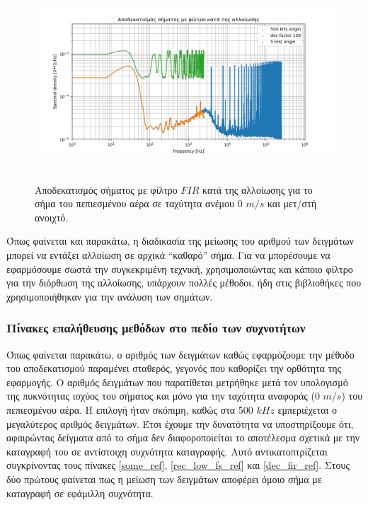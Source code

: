 \documentclass[breaklines=true, 12pt]{article}
\begin{document}
{{{\begin{figure}[htbp]
\centering
\includegraphics[width=500px,height=280px]{./decimation/anti_aliasing_fir.png}
\caption{\label{without_al}Αποδεκατισμός σήματος με φίλτρο \(FIR\) κατά της αλλοίωσης για το σήμα του πεπιεσμένου αέρα σε ταχύτητα ανέμου 0 \(m/s\) και μετ/στή ανοιχτό.}
\end{figure}

Όπως φαίνεται και παρακάτω, η διαδικασία της μείωσης του αριθμού των
δειγμάτων μπορεί να εντάξει αλλοίωση σε αρχικά “καθαρό” σήμα. Για να
μπορέσουμε να εφαρμόσουμε σωστά την συγκεκριμένη τεχνική, χρησιμοποιώντας
και κάποιο φίλτρο για την διόρθωση της αλλοίωσης, υπάρχουν πολλές μέθοδοι,
ήδη στις βιβλιοθήκες που χρησιμοποιήθηκαν για την ανάλυση των σημάτων.
\subsubsection{\textbf{Πίνακες επαλήθευσης μεθόδων στο πεδίο των συχνοτήτων}}
\label{sec:org4d71d73}

Όπως φαίνεται παρακάτω, ο αριθμός των δειγμάτων καθώς
εφαρμόζουμε την μέθοδο του αποδεκατισμού παραμένει σταθερός, γεγονός που
καθορίζει την ορθότητα της εφαρμογής. Ο αριθμός δειγμάτων που παρατίθεται
μετρήθηκε μετά τον υπολογισμό της πυκνότητας ισχύος του σήματος και μόνο
για την ταχύτητα αναφοράς (0 \(m/s\)) του πεπιεσμένου αέρα. Η επιλογή
ήταν σκόπιμη, καθώς στα 500 \(kHz\) εμπεριέχεται ο μεγαλύτερος αριθμός
δειγμάτων. Έτσι έχουμε την δυνατότητα να υποστηρίξουμε ότι, αφαιρώντας
δείγματα από το σήμα δεν διαφοροποιείται το αποτέλεσμα σχετικά με την
καταγραφή του σε αντίστοιχη συχνότητα καταγραφής. Αυτό αντικατοπτρίζεται
συγκρίνοντας τους πίνακες \ref{some_ref}, \ref{rec_low_fs_ref} και \ref{dec_fir_ref}. Στους
δύο πρώτους φαίνεται πως η μείωση των δειγμάτων αποφέρει όμοιο σήμα με
καταγραφή σε εφάμιλλη συχνότητα.

}}}
\end{document}
